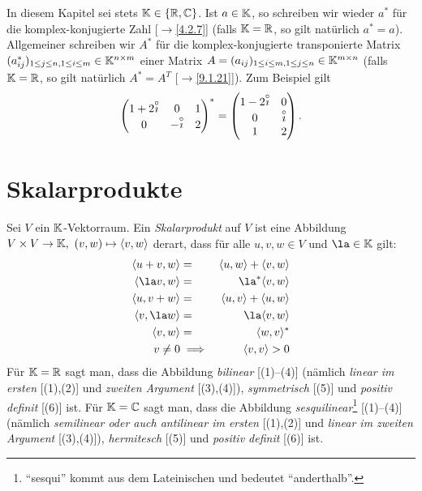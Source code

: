 \documentclass[../../main.tex]{subfiles}
\begin{document}
In diesem Kapitel sei stets $\mathbb K\in\{\mathbb R,\mathbb C\}$. Ist $a\in\mathbb K$, so schreiben wir wieder $a^*$ für die komplex-konjugierte Zahl [$\to$\ref{4.2.7}] (falls $\mathbb K=\mathbb R$, so gilt natürlich $a^*=a$).
Allgemeiner schreiben wir $A^*$ für die komplex-konjugierte transponierte Matrix $(a_{ij}^*)_{1\le j\le n,1\le i\le m}\in\mathbb K^{n\times m}$ einer Matrix
$A=(a_{ij})_{1\le i\le m,1\le j\le n}\in\mathbb K^{m\times n}$ (falls $\mathbb K=\mathbb R$, so gilt natürlich $A^*=A^T$ [$\to$\ref{9.1.21}]). Zum Beispiel gilt
\[\begin{pmatrix}1+2\overset\circ\imath&0&1\\0&-\overset\circ\imath&2\end{pmatrix}^*=\begin{pmatrix}1-2\overset\circ\imath&0\\0&\overset\circ\imath\\1&2\end{pmatrix}.\]

\section{Skalarprodukte}
\begin{df}\label{11.1.1}
Sei $V$ ein $\mathbb K$-Vektorraum. Ein \emph{Skalarprodukt} auf $V$ ist eine Abbildung $V\times V\to\K,\ (v,w)\mapsto\langle v,w\rangle$ derart, dass für alle
$u,v,w\in V$ und $\la\in\K$ gilt:
\begin{eqnarray}
\langle u+v,w\rangle&=&\langle u,w\rangle+\langle v,w\rangle\\
\langle\la v,w\rangle&=&\la^*\langle v,w\rangle\\
\langle u,v+w\rangle&=&\langle u,v\rangle+\langle u,w\rangle\\
\langle v,\la w\rangle&=&\la\langle v,w\rangle\\
\langle v,w\rangle&=&\langle w,v\rangle^*\\
v\ne0&\implies&\langle v,v\rangle>0
\end{eqnarray}
Für $\mathbb K=\mathbb R$ sagt man, dass die Abbildung \emph{bilinear} [(1)--(4)] (nämlich \emph{linear im ersten} [(1),(2)] und \emph{zweiten Argument} [(3),(4)]),
\emph{symmetrisch} [(5)] und \emph{positiv definit} [(6)] ist. Für  $\mathbb K=\mathbb C$ sagt man, dass die Abbildung \emph{sesquilinear}\footnote{"`sesqui"' kommt aus dem Lateinischen und bedeutet "`anderthalb"'.} [(1)--(4)] (nämlich \emph{semilinear oder auch antilinear im ersten} [(1),(2)] und \emph{linear im zweiten Argument} [(3),(4)]),
\emph{hermitesch} [(5)] und \emph{positiv definit} [(6)] ist.
\end{df}
\end{document}
